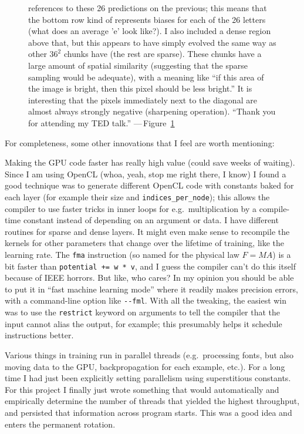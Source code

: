 \documentclass[twocolumn]{article}
\begin{document}
\begin{figure}[ht!b]
{    references to these 26 predictions on the previous; this means
    that the bottom row kind of represents biases for each of the 26
    letters (what does an average 'e' look like?). I also included a
    dense region above that, but this appears to have simply evolved
    the same way as other $36^2$ chunks have (the rest are sparse).
    These chunks have a large amount of spatial similarity (suggesting
    that the sparse sampling would be adequate), with a meaning like
    ``if this area of the image is bright, then this pixel should
    be less bright.'' It is interesting that the pixels immediately
    next to the diagonal are almost always strongly negative
    (sharpening operation). ``Thank you for attending my TED talk.''
    ---\,Figure~\ref{fig:lastlayer}}
  \label{fig:lastlayer}
\end{figure}

For completeness, some other innovations that I feel are worth
mentioning:

Making the GPU code faster has really high value (could save weeks of
waiting). Since I am using OpenCL (whoa, yeah, stop me right there, I
know) I found a good technique was to generate different OpenCL code with
constants baked for each layer (for example their size and
\verb+indices_per_node+); this allows the compiler to use faster
tricks in inner loops for e.g.~multiplication by a compile-time constant
instead of depending on an argument or data. I have different routines
for sparse and dense layers. It might even make sense to recompile the
kernels for other parameters that change over the lifetime of
training, like the learning rate. The {\tt fma} instruction (so named
for the physical law $F=MA$) is a bit faster than
\verb|potential += w * v|, and I guess the compiler can't do this
itself because of IEEE horrors. But like, who cares? In my opinion you
should be able to put it in ``fast machine learning mode'' where it
readily makes precision errors, with a command-line option like
\verb+--fml+. With all the tweaking, the easiest win was to use the
{\tt restrict} keyword on arguments to tell the compiler that the
input cannot alias the output, for example; this presumably helps
it schedule instructions better.

Various things in training run in parallel threads (e.g.~processing
fonts, but also moving data to the GPU, backpropagation for each
example, etc.). For a long time I had just been explicitly setting
parallelism using superstitious constants. For this project I finally
just wrote something that would automatically and empirically
determine the number of threads that yielded the highest throughput,
and persisted that information across program starts. This was a
good idea and enters the permanent rotation.
\end{document}
